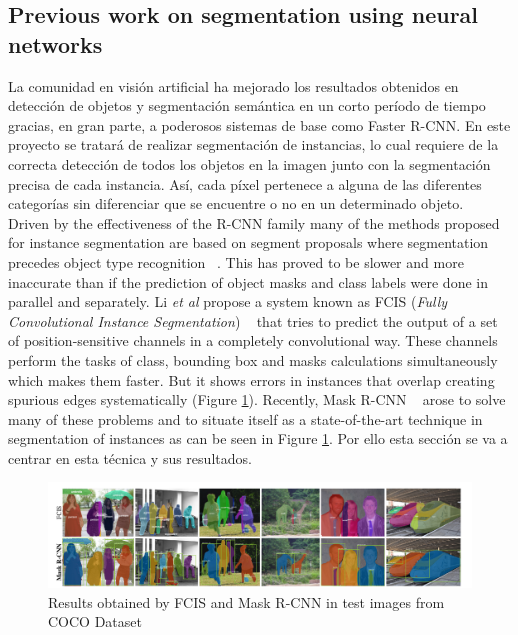 \documentclass{bmvc2k}
\def\etal{\emph{et al}\bmvaOneDot}
\begin{document}
\subsection{Previous work on segmentation using neural networks}
La comunidad en visión artificial ha mejorado los resultados obtenidos en detección de objetos y segmentación semántica en un corto período de tiempo gracias, en gran parte, a poderosos sistemas de base como Faster R-CNN. En este proyecto se tratará de realizar segmentación de instancias, lo cual requiere de la correcta detección de todos los objetos en la imagen junto con la segmentación precisa de cada instancia. Así, cada píxel pertenece a alguna de las diferentes categorías sin diferenciar que se encuentre o no en un determinado objeto.\\ %
Driven by the effectiveness of the R-CNN family many of the methods proposed for instance segmentation are based on segment proposals where segmentation precedes object type recognition ~\cite{pinheiro2015learning}. This has proved to be slower and more inaccurate than if the prediction of object masks and class labels were done in parallel and separately. Li \etal{} propose a system known as FCIS (\textit{Fully Convolutional Instance Segmentation}) ~\cite{li2016fully} that tries to predict the output of a set of position-sensitive channels in a completely convolutional way. These channels perform the tasks of class, bounding box and masks calculations simultaneously which makes them faster. But it shows errors in instances that overlap creating spurious edges systematically (Figure \ref{fig:fcis_mask}).
Recently, Mask R-CNN ~\cite{he2017mask} arose to solve many of these problems and to situate itself as a state-of-the-art technique in segmentation of instances as can be seen in Figure \ref{fig:fcis_mask}. Por ello esta sección se va a centrar en esta técnica y sus resultados.\\ %
\begin{figure}[H]
\begin{center}
\includegraphics[scale=0.30]{fcis_vs_maskrcnn.png}
\caption{Results obtained by FCIS and Mask R-CNN in test images from COCO Dataset}
\label{fig:fcis_mask}
\end{center}
\end{figure}
\end{document}
